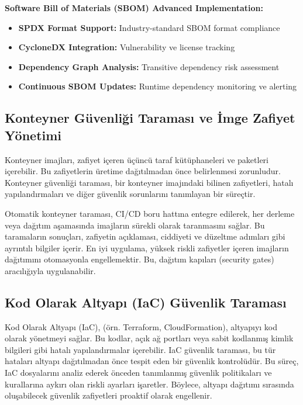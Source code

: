 \textbf{Software Bill of Materials (SBOM) Advanced Implementation:}
\begin{itemize}
    \item \textbf{SPDX Format Support:} Industry-standard SBOM format compliance
    \item \textbf{CycloneDX Integration:} Vulnerability ve license tracking
    \item \textbf{Dependency Graph Analysis:} Transitive dependency risk assessment
    \item \textbf{Continuous SBOM Updates:} Runtime dependency monitoring ve alerting
\end{itemize}

\subsection{Konteyner Güvenliği Taraması ve İmge Zafiyet Yönetimi}

Konteyner imajları, zafiyet içeren üçüncü taraf kütüphaneleri ve paketleri içerebilir. Bu zafiyetlerin üretime dağıtılmadan önce belirlenmesi zorunludur. Konteyner güvenliği taraması, bir konteyner imajındaki bilinen zafiyetleri, hatalı yapılandırmaları ve diğer güvenlik sorunlarını tanımlayan bir süreçtir.

Otomatik konteyner taraması, CI/CD boru hattına entegre edilerek, her derleme veya dağıtım aşamasında imajların sürekli olarak taranmasını sağlar. Bu taramaların sonuçları, zafiyetin açıklaması, ciddiyeti ve düzeltme adımları gibi ayrıntılı bilgiler içerir. En iyi uygulama, yüksek riskli zafiyetler içeren imajların dağıtımını otomasyonla engellemektir. Bu, dağıtım kapıları (security gates) aracılığıyla uygulanabilir.

\subsection{Kod Olarak Altyapı (IaC) Güvenlik Taraması}

Kod Olarak Altyapı (IaC), (örn. Terraform, CloudFormation), altyapıyı kod olarak yönetmeyi sağlar. Bu kodlar, açık ağ portları veya sabit kodlanmış kimlik bilgileri gibi hatalı yapılandırmalar içerebilir. IaC güvenlik taraması, bu tür hataları altyapı dağıtılmadan önce tespit eden bir güvenlik kontrolüdür. Bu süreç, IaC dosyalarını analiz ederek önceden tanımlanmış güvenlik politikaları ve kurallarına aykırı olan riskli ayarları işaretler. Böylece, altyapı dağıtımı sırasında oluşabilecek güvenlik zafiyetleri proaktif olarak engellenir.

